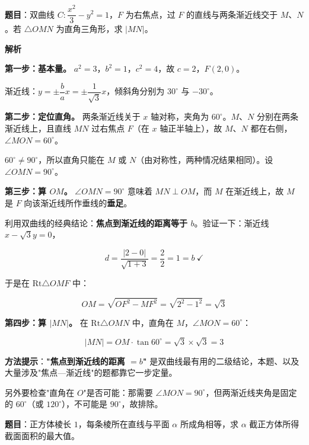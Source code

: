 \par\medskip


\textbf{题目}：双曲线 $C:\dfrac{x^{2}}3-y^{2}=1$，$F$ 为右焦点，过 $F$ 的直线与两条渐近线交于 $M$、$N$。若 $\triangle OMN$ 为直角三角形，求 $|MN|$。

\textbf{解析}

\textbf{第一步：基本量。} $a^{2}=3$，$b^{2}=1$，$c^{2}=4$，故 $c=2$，$F(2,0)$。

渐近线：$y=\pm\dfrac{b}{a}x=\pm\dfrac1{\sqrt3}x$，倾斜角分别为 $30^\circ$ 与 $-30^\circ$。

\textbf{第二步：定位直角。} 两条渐近线关于 $x$ 轴对称，夹角为 $60^\circ$。$M$、$N$ 分别在两条渐近线上，且直线 $MN$ 过右焦点 $F$（在 $x$ 轴正半轴上），故 $M$、$N$ 都在右侧，$\angle MON=60^\circ$。

$60^\circ\ne90^\circ$，所以直角只能在 $M$ 或 $N$（由对称性，两种情况结果相同）。设 $\angle OMN=90^\circ$。

\textbf{第三步：算 $OM$。} $\angle OMN=90^\circ$ 意味着 $MN\perp OM$，而 $M$ 在渐近线上，故 $M$ 是 $F$ 向该渐近线所作垂线的\textbf{垂足}。

利用双曲线的经典结论：\textbf{焦点到渐近线的距离等于 $b$}。验证一下：渐近线 $x-\sqrt3y=0$，

\[d=\frac{|2-0|}{\sqrt{1+3}}=\frac22=1=b\ \checkmark\]

于是在 $\mathrm{Rt}\triangle OMF$ 中：

\[OM=\sqrt{OF^{2}-MF^{2}}=\sqrt{2^{2}-1^{2}}=\sqrt3\]

\textbf{第四步：算 $|MN|$。} 在 $\mathrm{Rt}\triangle OMN$ 中，直角在 $M$，$\angle MON=60^\circ$：

\[|MN|=OM\cdot\tan60^\circ=\sqrt3\times\sqrt3=3\]


\begin{gktip}
\textbf{方法提示}：\textbf{"焦点到渐近线的距离 $=b$"} 是双曲线最有用的二级结论，本题、以及大量涉及"焦点—渐近线"的题都靠它一步定量。

另外要检查"直角在 $O$"是否可能：那需要 $\angle MON=90^\circ$，但两渐近线夹角是固定的 $60^\circ$（或 $120^\circ$），不可能是 $90^\circ$，故排除。
\end{gktip}

\par\medskip


\textbf{题目}：正方体棱长 $1$，每条棱所在直线与平面 $\alpha$ 所成角相等，求 $\alpha$ 截正方体所得截面面积的最大值。

